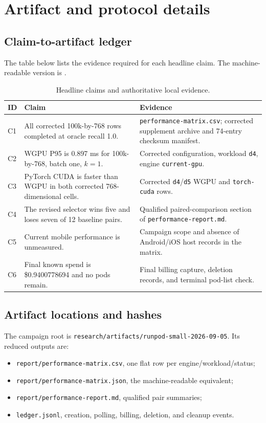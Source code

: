 \section{Artifact and protocol details}
\label{sec:artifact}

\subsection{Claim-to-artifact ledger}
The table below lists the evidence required for each headline claim. The machine-readable version is .

\begin{table}[H]
\centering\small
\caption{Headline claims and authoritative local evidence.}
\label{tab:ledger}
\begin{tabular}{p{.06\linewidth}p{.48\linewidth}p{.38\linewidth}}
\toprule
ID & Claim & Evidence \\
\midrule
C1 & All corrected 100k-by-768 rows completed at oracle recall 1.0. & \texttt{performance-matrix.csv}; corrected supplement archive and 74-entry checksum manifest. \\
C2 & WGPU P95 is 0.897 ms for 100k-by-768, batch one, \(k=1\). & Corrected configuration, workload \texttt{d4}, engine \texttt{current-gpu}. \\
C3 & PyTorch CUDA is faster than WGPU in both corrected 768-dimensional cells. & Corrected \texttt{d4}/\texttt{d5} WGPU and \texttt{torch-cuda} rows. \\
C4 & The revised selector wins five and loses seven of 12 baseline pairs. & Qualified paired-comparison section of \texttt{performance-report.md}. \\
C5 & Current mobile performance is unmeasured. & Campaign scope and absence of Android/iOS host records in the matrix. \\
C6 & Final known spend is \$0.9400778694 and no pods remain. & Final billing capture, deletion records, and terminal pod-list check. \\
\bottomrule
\end{tabular}
\end{table}

\subsection{Artifact locations and hashes}
The campaign root is \texttt{research/artifacts/runpod-small-2026-09-05}. Its reduced outputs are:
\begin{itemize}
\item \texttt{report/performance-matrix.csv}, one flat row per engine/workload/status;
\item \texttt{report/performance-matrix.json}, the machine-readable equivalent;
\item \texttt{report/performance-report.md}, qualified pair summaries;
\item \texttt{ledger.jsonl}, creation, polling, billing, deletion, and cleanup events.
\end{itemize}

